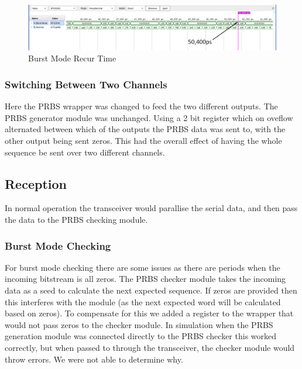 \begin{figure}[ht]
    \centering
    \hspace*{-3cm}\includegraphics[width=1.5\linewidth]{img/burst_mode_3.png}
    \caption{Burst Mode Recur Time}%
    \label{fig:burst_mode_recur}
\end{figure}

\subsubsection{Switching Between Two Channels}%
\label{ssub:switching_between_two_channels}
Here the PRBS wrapper was changed to feed the two different outputs. The PRBS
generator module was unchanged. Using a 2 bit register which on oveflow
alternated between which of the outputs the PRBS data was sent to, with the
other output being sent zeros. This had the overall effect of having the whole
sequence be sent over two different channels.



\subsection{Reception}%
\label{sub:prbs_checking}
In normal operation the transceiver would parallise the serial data, and then
pass the data to the PRBS checking module.  

\subsubsection{Burst Mode Checking}%
\label{ssub:burst_mode_checking}
For burst mode checking there are some issues as there are periods when the
incoming bitstream is all zeros. The PRBS checker module takes the incoming
data as a seed to calculate the next expected sequence. If zeros are provided
then this interferes with the module (as the next expected word will be calculated
based on zeros). To compensate for this we added a register to the wrapper that
would not pass zeros to the checker module. 
In simulation when the PRBS generation module was connected directly to the
PRBS checker this worked correctly, but when passed to through the transceiver,
the checker module would throw errors.  We were not able to determine why.

